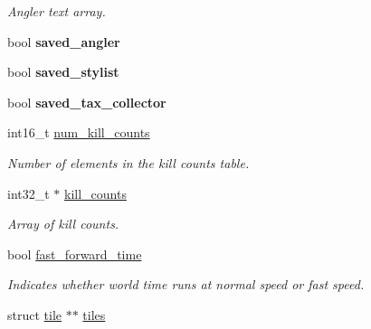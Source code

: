 \begin{DoxyCompactItemize}
\begin{DoxyCompactList}\small\item\em Angler text array. \end{DoxyCompactList}\item 
\hypertarget{structworld_a728903b6c7c39fa21488699ed9352eb4}{}bool {\bfseries saved\+\_\+angler}\label{structworld_a728903b6c7c39fa21488699ed9352eb4}

\item 
\hypertarget{structworld_a84d8073b5e8bdca90ad051fc5239b9d6}{}bool {\bfseries saved\+\_\+stylist}\label{structworld_a84d8073b5e8bdca90ad051fc5239b9d6}

\item 
\hypertarget{structworld_ae8c21e43d8acff22dd5f0261796d381f}{}bool {\bfseries saved\+\_\+tax\+\_\+collector}\label{structworld_ae8c21e43d8acff22dd5f0261796d381f}

\item 
\hypertarget{structworld_a44c9cbedbbda339519f414c896335126}{}int16\+\_\+t \hyperlink{structworld_a44c9cbedbbda339519f414c896335126}{num\+\_\+kill\+\_\+counts}\label{structworld_a44c9cbedbbda339519f414c896335126}

\begin{DoxyCompactList}\small\item\em Number of elements in the kill counts table. \end{DoxyCompactList}\item 
\hypertarget{structworld_a0a3672b6451492619d2979fdbef05d74}{}int32\+\_\+t $\ast$ \hyperlink{structworld_a0a3672b6451492619d2979fdbef05d74}{kill\+\_\+counts}\label{structworld_a0a3672b6451492619d2979fdbef05d74}

\begin{DoxyCompactList}\small\item\em Array of kill counts. \end{DoxyCompactList}\item 
\hypertarget{structworld_a986bcca4868355685b0363c2ce263dbc}{}bool \hyperlink{structworld_a986bcca4868355685b0363c2ce263dbc}{fast\+\_\+forward\+\_\+time}\label{structworld_a986bcca4868355685b0363c2ce263dbc}

\begin{DoxyCompactList}\small\item\em Indicates whether world time runs at normal speed or fast speed. \end{DoxyCompactList}\item 
\hypertarget{structworld_ae67e747ac302ebb0c13dfa628a27100a}{}struct \hyperlink{structtile}{tile} $\ast$$\ast$ \hyperlink{structworld_ae67e747ac302ebb0c13dfa628a27100a}{tiles}\label{structworld_ae67e747ac302ebb0c13dfa628a27100a}


\end{DoxyCompactItemize}
